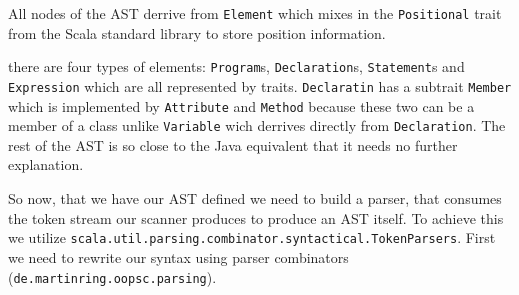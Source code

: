 \documentclass{style}
\begin{document}
All nodes of the AST derrive from \texttt{Element} which mixes in the \texttt{Positional} trait from the Scala standard library to store position information.

there are four types of elements: \texttt{Program}s, \texttt{Declaration}s, \texttt{Statement}s and \texttt{Expression} which are all represented by traits. \texttt{Declaratin} has a subtrait \texttt{Member} which is implemented by \texttt{Attribute} and \texttt{Method} because these two can be a member of a class unlike \texttt{Variable} wich derrives directly from \texttt{Declaration}. The rest of the AST is so close to the Java equivalent that it needs no further explanation.

So now, that we have our AST defined we need to build a parser, that consumes the token stream our scanner produces to produce an AST itself. To achieve this we utilize \texttt{scala.util.parsing.combinator.syntactical.TokenParsers}. First we need to rewrite our syntax using parser combinators (\texttt{de.martinring.oopsc.parsing}).
\end{document}
